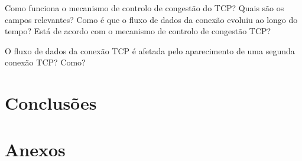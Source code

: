 \documentclass[11pt]{article}
\begin{document}
 Como funciona o mecanismo de controlo de congestão do TCP? Quais são os campos relevantes? Como é que o fluxo de dados da conexão evoluiu ao longo do tempo? Está de acordo com o mecanismo de controlo de congestão TCP?

 O fluxo de dados da conexão TCP é afetada pelo aparecimento de uma segunda conexão TCP? Como?

\section{Conclusões}

\section{Anexos}
\end{document}
